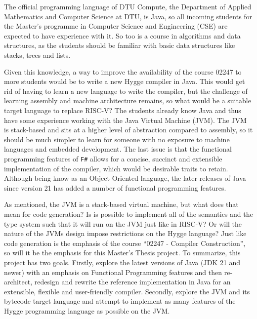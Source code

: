 The official programming language of DTU Compute, the Department of Applied Mathematics and Computer Science at DTU, is Java, so
all incoming students for the Master's programme in Computer Science and Engineering (CSE) are expected to have experience with it.
So too is a course in algorithms and data structures, as the students should be familiar with basic data structures like stacks, trees and lists.

Given this knowledge, a way to improve the availability of the course 02247 to more students would be to write a new Hygge compiler in Java. 
This would get rid of having to learn a new language to write the compiler, but the challenge of learning assembly and machine architecture remains,
so what would be a suitable target language to replace RISC-V? The students already know Java and thus have some experience working with 
the Java Virtual Machine (JVM). The JVM is stack-based and sits at a higher level of abstraction compared to assembly\cite{jvm_spec}, so it should be much simpler 
to learn for someone with no exposure to machine languages and embedded development. The last issue is that the functional programming features
of \texttt{F\#} allows for a concise, succinct and extensible implementation of the compiler, which would be desirable traits to retain. 
Although being know as an Object-Oriented language, the later releases of Java since version 21 has added a number of functional programming features.

As mentioned, the JVM is a stack-based virtual machine\cite{jvm_spec}, but what does that mean for code generation? Is is possible to implement all of the semantics
and the type system such that it will run on the JVM just like in RISC-V? Or will the nature of the JVMs design impose restrictions on the Hygge language?
Just like code generation is the emphasis of the course ``02247 - Compiler Construction''\cite{curriculum_02247}, so will it be the emphasis for this Master's Thesis project.
To summarize, this project has two goals. Firstly, explore the latest versions of Java (JDK 21 and newer) with an emphasis on Functional Programming features and then re-architect, redesign and rewrite the reference implementation in Java for an extensible, flexible and user-friendly compiler.
Secondly, explore the JVM and its bytecode target language and attempt to implement as many features of the Hygge programming language as possible on the JVM.
